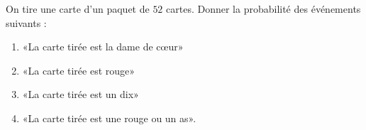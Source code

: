 
\begin{exercice}\label{exosmath-0187}

    On tire une carte d'un paquet de \( 52\) cartes.
            Donner la probabilité des événements suivants :
            \begin{enumerate}
                \item
                    «La carte tirée est la dame de cœur» 
                \item
                    «La carte tirée est rouge» 
                \item
                    «La carte tirée est un dix» 
                \item
                    «La carte tirée est une rouge ou un as».
            \end{enumerate}

\end{exercice}

